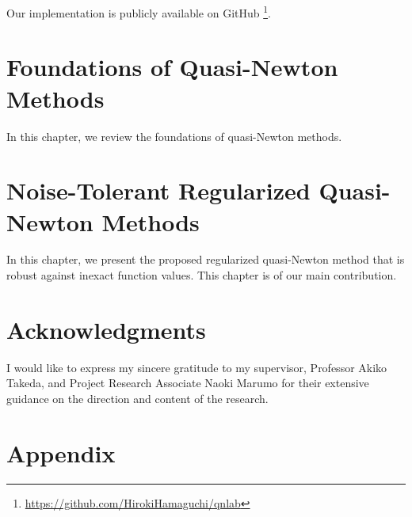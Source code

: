 \documentclass[uplatex,english,suri,master,dvipdfmx]{suribt}
\begin{document}
Our implementation is publicly available on GitHub%
\footnote{\label{fn:ourGitHub}\url{https://github.com/HirokiHamaguchi/qnlab}}.

\chapter{Foundations of Quasi-Newton Methods}
\label{chap:background}

In this chapter, we review the foundations of quasi-Newton methods.

\newcommand{\myQED}{}





\chapter{Noise-Tolerant Regularized Quasi-Newton Methods}
\label{chap:main}

In this chapter, we present the proposed regularized quasi-Newton method that is robust against inexact function values.
This chapter is of our main contribution.



\backmatter%
\chapter{Acknowledgments}%

I would like to express my sincere gratitude to my supervisor, Professor Akiko Takeda, and Project Research Associate Naoki Marumo for their extensive guidance on the direction and content of the research.




\appendix%

\chapter{Appendix}


\end{document}
